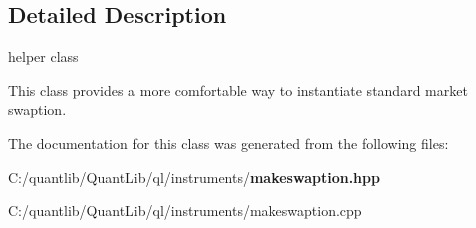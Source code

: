 \subsection{Detailed Description}
helper class 

This class provides a more comfortable way to instantiate standard market swaption. 

The documentation for this class was generated from the following files\+:\begin{DoxyCompactItemize}
\item 
C\+:/quantlib/\+Quant\+Lib/ql/instruments/{\bf makeswaption.\+hpp}\item 
C\+:/quantlib/\+Quant\+Lib/ql/instruments/makeswaption.\+cpp\end{DoxyCompactItemize}
